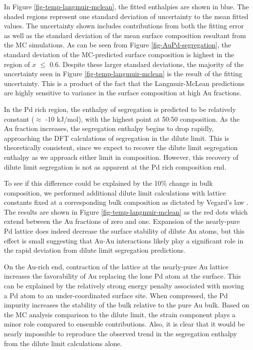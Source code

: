 \documentclass[12pt]{cmuthesis}
\begin{document}
In Figure \ref{fig-temp-langmuir-mclean}, the fitted enthalpies are shown in blue. The shaded regions represent one standard deviation of uncertainty to the mean fitted values. The uncertainty shown includes contributions from both the fitting error as well as the standard deviation of the mean surface composition resultant from the MC simulations. As can be seen from Figure \ref{fig-AuPd-segregation}, the standard deviation of the MC-predicted surface composition is highest in the region of \(x\) \(\le\) 0.6. Despite these larger standard deviations, the majority of the uncertainty seen in Figure \ref{fig-temp-langmuir-mclean} is the result of the fitting uncertainty. This is a product of the fact that the Langmuir-McLean predictions are highly sensitive to variance in the surface composition at high Au fractions.

In the Pd rich region, the enthalpy of segregation is predicted to be relatively constant (\(\approx\) -10 kJ/mol), with the highest point at 50:50 composition. As the Au fraction increases, the segregation enthalpy begins to drop rapidly, approaching the DFT calculations of segregation in the dilute limit. This is theoretically consistent, since we expect to recover the dilute limit segregation enthalpy as we approach either limit in composition. However, this recovery of dilute limit segregation is not as apparent at the Pd rich composition end.

To see if this difference could be explained by the 10\% change in bulk composition, we performed additional dilute limit calculations with lattice constants fixed at a corresponding bulk composition as dictated by Vegard's law \cite{denton-1991-vegar-law}. The results are shown in Figure \ref{fig-temp-langmuir-mclean} as the red dots which extend between the Au fractions of zero and one. Expansion of the nearly-pure Pd lattice does indeed decrease the surface stability of dilute Au atoms, but this effect is small suggesting that Au-Au interactions likely play a significant role in the rapid deviation from dilute limit segregation predictions.

On the Au-rich end, contraction of the lattice at the nearly-pure Au lattice increases the favorability of Au replacing the lone Pd atom at the surface. This can be explained by the relatively strong energy penalty associated with moving a Pd atom to an under-coordinated surface site. When compressed, the Pd impurity increases the stability of the bulk relative to the pure Au bulk. Based on the MC analysis comparison to the dilute limit, the strain component plays a minor role compared to ensemble contributions. Also, it is clear that it would be nearly impossible to reproduce the observed trend in the segregation enthalpy from the dilute limit calculations alone.
\end{document}
